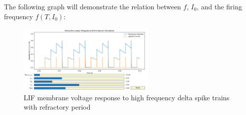The following graph will demonstrate the relation between \(f\), \(I_0\), and the firing frequency \(f(T, I_0)\):

\begin{figure}[H]
    \centering
    \includegraphics[width=0.6\textwidth]{scientific-background/computational-models/LIF/graphs/LIF-high-freq-spike-response-ref-final.png}
    \caption{LIF membrane voltage response to high frequency delta spike trains with refractory period}
    \label{fig:LIF-high-freq-spike-ref-final}
\end{figure}
